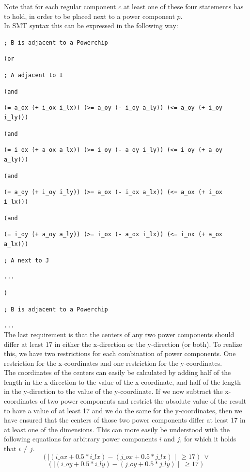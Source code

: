 \documentclass[a4paper]{article}
\begin{document}
	Note that for each regular component $c$ at least one of these four statements has to hold, in order to be placed next to a power component $p$.\\
	
	\noindent In SMT syntax this can be expressed in the following way:
	
	{\tt ; B is adjacent to a Powerchip}
	
	{\tt (or}
	
	{\tt ; A adjacent to I}
	
	{\tt (and}
	
	{\tt (= a\_ox (+ i\_ox i\_lx)) (>= a\_oy (- i\_oy a\_ly)) (<= a\_oy (+ i\_oy i\_ly)))}
	
	{\tt (and}
	
	{\tt (= i\_ox (+ a\_ox a\_lx)) (>= i\_oy (- a\_oy i\_ly)) (<= i\_oy (+ a\_oy a\_ly)))}
	
	{\tt (and }
	
	{\tt (= a\_oy (+ i\_oy i\_ly)) (>= a\_ox (- i\_ox a\_lx)) (<= a\_ox (+ i\_ox i\_lx)))}
	
	{\tt (and}
	
	{\tt (= i\_oy (+ a\_oy a\_ly)) (>= i\_ox (- a\_ox i\_lx)) (<= i\_ox (+ a\_ox a\_lx)))}
	
	{\tt ; A next to J}
	
	{\tt ...}
	
	{\tt )}

	{\tt ; B is adjacent to a Powerchip}

	{\tt ...}\\
	
	\noindent The last requirement is that the centers of any two power components should differ at least 17 in either the x-direction or the y-direction (or both). To realize this, we have two restrictions for each combination of power components. One restriction for the x-coordinates and one restriction for the y-coordinates.\\
	
	The coordinates of the centers can easily be calculated by adding half of the length in the x-direction to the value of the x-coordinate, and half of the length in the y-direction to the value of the y-coordinate. If we now subtract the x-coordinates of two power components and restrict the absolute value of the result to have a value of at least 17 and we do the same for the y-coordinates, then we have ensured that the centers of those two power components differ at least 17 in at least one of the dimensions. This can more easily be understood with the following equations for arbitrary power components $i$ and $j$, for which it holds that $i \neq j$.	
	$$(\mid(i\_ox + 0.5 * i\_lx) - (j\_ox + 0.5 * j\_lx)\mid\ \geq 17)\ \vee$$
	$$(\mid(i\_oy + 0.5 * i\_ly) - (j\_oy + 0.5 * j\_ly)\mid\ \geq 17) $$
	
\end{document}
